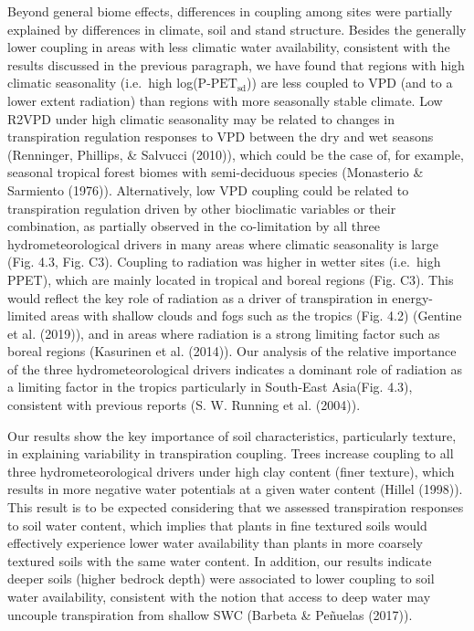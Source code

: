 \documentclass[11pt,twoside]{reedthesis}
\begin{document}
Beyond general biome effects, differences in coupling among sites were
partially explained by differences in climate, soil and stand structure.
Besides the generally lower coupling in areas with less climatic water
availability, consistent with the results discussed in the previous
paragraph, we have found that regions with high climatic seasonality
(i.e.~high log(\(\text{P-PET}_{\text{sd}}\))) are less coupled to VPD
(and to a lower extent radiation) than regions with more seasonally
stable climate. Low R2VPD under high climatic seasonality may be related
to changes in transpiration regulation responses to VPD between the dry
and wet seasons (Renninger, Phillips, \& Salvucci (2010)), which could
be the case of, for example, seasonal tropical forest biomes with
semi-deciduous species (Monasterio \& Sarmiento (1976)). Alternatively,
low VPD coupling could be related to transpiration regulation driven by
other bioclimatic variables or their combination, as partially observed
in the co-limitation by all three hydrometeorological drivers in many
areas where climatic seasonality is large (Fig. 4.3, Fig. C3). Coupling
to radiation was higher in wetter sites (i.e.~high PPET), which are
mainly located in tropical and boreal regions (Fig. C3). This would
reflect the key role of radiation as a driver of transpiration in
energy-limited areas with shallow clouds and fogs such as the tropics
(Fig. 4.2) (Gentine et al. (2019)), and in areas where radiation is a
strong limiting factor such as boreal regions (Kasurinen et al. (2014)).
Our analysis of the relative importance of the three hydrometeorological
drivers indicates a dominant role of radiation as a limiting factor in
the tropics particularly in South-East Asia(Fig. 4.3), consistent with
previous reports (S. W. Running et al. (2004)).\par

Our results show the key importance of soil characteristics,
particularly texture, in explaining variability in transpiration
coupling. Trees increase coupling to all three hydrometeorological
drivers under high clay content (finer texture), which results in more
negative water potentials at a given water content (Hillel (1998)). This
result is to be expected considering that we assessed transpiration
responses to soil water content, which implies that plants in fine
textured soils would effectively experience lower water availability
than plants in more coarsely textured soils with the same water content.
In addition, our results indicate deeper soils (higher bedrock depth)
were associated to lower coupling to soil water availability, consistent
with the notion that access to deep water may uncouple transpiration
from shallow SWC (Barbeta \& Peñuelas (2017)).\par
\end{document}
